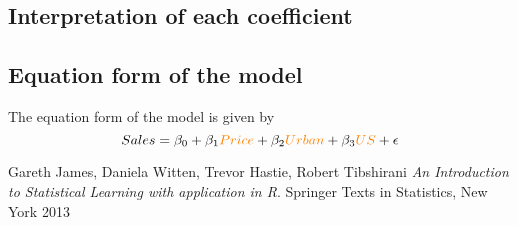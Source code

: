 \documentclass[11pt, oneside]{article}   	%
\begin{document}
\subsection{Interpretation of each coefficient}

\subsection{Equation form of the model}
The equation form of the model is given by
\begin{equation}\label{eq:mr}
Sales = \beta_{0} + \beta_{1}\textcolor{orange}{Price} + \beta_{2}\textcolor{orange}{Urban}+ \beta_{3}\textcolor{orange}{US}+ \epsilon
\end{equation}
\medskip
\begin{thebibliography}{9}
Gareth James, Daniela Witten, Trevor Hastie, Robert Tibshirani
\textit{An Introduction to Statistical Learning with application in R}. 
Springer Texts in Statistics, New York 2013






 
\end{thebibliography}
\end{document}
